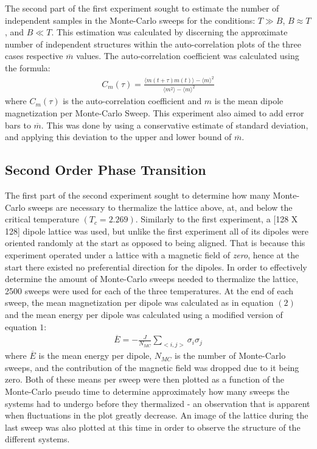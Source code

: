 \documentclass[twocolumn]{article}
\begin{document}
The second part of the first experiment sought to estimate the number of independent
samples in the Monte-Carlo sweeps for the conditions: $T \gg B$, $B\approx T$, and $B \ll T$. This estimation was calculated by discerning the approximate number of independent structures within the auto-correlation plots of the three cases respective $\overline{m}$ values. The auto-correlation coefficient was calculated using the formula:
\begin{align}
C_m\left(\tau\right)=\frac{\langle m(t+\tau)m(t) \rangle - \langle m \rangle^{2}}
{\langle m^{2}\rangle - \langle m \rangle^{2}}
\end{align}
where $C_m(\tau)$ is the auto-correlation coefficient and $m$ is the mean dipole magnetization per Monte-Carlo Sweep. This experiment also aimed to add error bars to $\overline{m}$. This was done by using a conservative estimate of standard deviation, and applying this deviation to the upper and lower bound of $\overline{m}$.
\subsection{Second Order Phase Transition}
\hspace{\parindent}The first part of the second experiment sought to determine how many Monte-Carlo sweeps are necessary to thermalize the lattice above, at, and below the critical temperature $\left(T_c=2.269\right)$. Similarly to the first experiment, a [128 X 128] dipole lattice was used, but unlike the first experiment all of its dipoles were oriented randomly at the start as opposed to being aligned. That is because this experiment operated under a lattice with a magnetic field of \textit{zero}, hence at the start there existed no preferential direction for the dipoles. In order to effectively determine the amount of Monte-Carlo sweeps needed to thermalize the lattice, 2500 sweeps were used for each of the three temperatures. At the end of each sweep, the mean magnetization per dipole was calculated as in equation $(2)$ and the mean energy per dipole was calculated using a modified version of equation $1$:
\begin{align}
\overline{E}=-\frac{J}{N_{MC}}\sum_{<i,j>}\sigma_i\sigma_j
\end{align}
where $\overline{E}$ is the mean energy per dipole, $N_{MC}$ is the number of Monte-Carlo sweeps, and the contribution of the magnetic field was dropped due to it being zero. Both of these means per sweep were then plotted as a function of the Monte-Carlo pseudo time to determine approximately how many sweeps the systems had to undergo before they thermalized - an observation that is apparent when fluctuations in the plot greatly decrease. An image of the lattice during the last sweep was also plotted at this time in order to observe the structure of the different systems.
\end{document}
